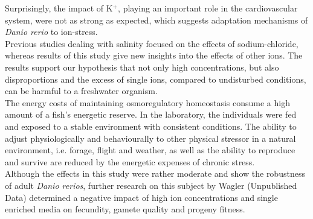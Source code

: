 \documentclass[twoside]{article}
\begin{document}
\begin{multicols}{2}
Surprisingly, the impact of K$^+$, playing an important role in the cardiovascular system, were not as strong as expected, which suggests adaptation mechanisms of \textit{Danio rerio} to ion-stress. \\
Previous studies dealing with salinity focused on the effects of sodium-chloride, whereas results of this study give new insights into the effects of other ions. The results support our hypothesis that not only high concentrations, but also disproportions and the excess of single ions, compared to undisturbed conditions, can be harmful to a freshwater organism. \\ 
The energy costs of maintaining osmoregulatory homeostasis consume a high amount of a fish's energetic reserve. In the laboratory, the individuals were fed and exposed to a stable environment with consistent conditions. The ability to adjust physiologically and behaviourally to other physical stressor in a natural environment, i.e. forage, flight and weather, as well as the ability to reproduce and survive are reduced by the energetic expenses of chronic stress. \\
Although the effects in this study were rather moderate and show the robustness of adult \textit{Danio rerios}, further research on this subject by Wagler (Unpublished Data) determined a negative impact of high ion concentrations and single enriched media on fecundity, gamete quality and progeny fitness. 


\end{multicols}
\end{document}

